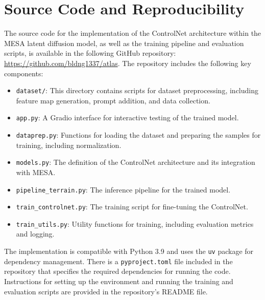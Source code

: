 \chapter{Source Code and Reproducibility}
\label{app:source_code}

The source code for the implementation of the ControlNet architecture within the MESA latent diffusion model, as well as the training pipeline and evaluation scripts, is available in the following GitHub repository: \url{https://github.com/bldng1337/atlas}. The repository includes the following key components:

\begin{itemize}
	\item \texttt{dataset/}: This directory contains scripts for dataset preprocessing, including feature map generation, prompt addition, and data collection.
	\item \texttt{app.py}: A Gradio interface for interactive testing of the trained model.
	\item \texttt{dataprep.py}: Functions for loading the dataset and preparing the samples for training, including normalization.
	\item \texttt{models.py}: The definition of the ControlNet architecture and its integration with MESA.
	\item \texttt{pipeline\_terrain.py}: The inference pipeline for the trained model.
	\item \texttt{train\_controlnet.py}: The training script for fine-tuning the ControlNet.
	\item \texttt{train\_utils.py}: Utility functions for training, including evaluation metrics and logging.
\end{itemize}

The implementation is compatible with Python 3.9 and uses the \texttt{uv} package for dependency management. There is a \texttt{pyproject.toml} file included in the repository that specifies the required dependencies for running the code. Instructions for setting up the environment and running the training and evaluation scripts are provided in the repository's README file.
